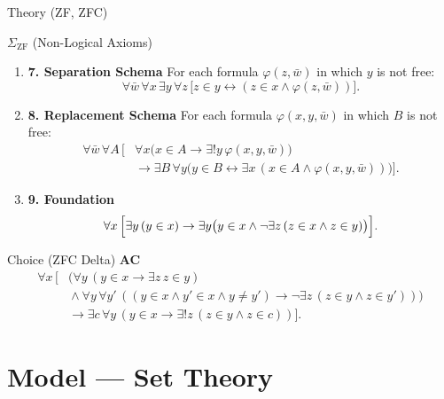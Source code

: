 \documentclass[12pt, a4paper]{report}
\begin{document}
\begin{modelbox}{Theory (ZF, ZFC)}
\begin{modelcomponent}{\(\Sigma_{\mathrm{ZF}}\) (Non-Logical Axioms)}
\begin{enumerate}[leftmargin=1.6em,itemsep=2pt]
  \item \textbf{7. Separation Schema}
  For each formula \(\varphi(z,\bar w)\) in which \(y\) is not free:
  \[
  \forall \bar w\,\forall x\,\exists y\,\forall z\,
  \bigl[z\in y\leftrightarrow (z\in x\wedge \varphi(z,\bar w))\bigr].
  \]

  \item \textbf{8. Replacement Schema}
  For each formula \(\varphi(x,y,\bar w)\) in which \(B\) is not free:
  \[
  \begin{aligned}
  \forall \bar w\,\forall A\,\Big[&
    \forall x\bigl(x\in A\to \exists!y\,\varphi(x,y,\bar w)\bigr)\\
    &{}\to
    \exists B\,\forall y\bigl(y\in B\leftrightarrow
      \exists x\,(x\in A\wedge \varphi(x,y,\bar w))\bigr)
  \Big].
  \end{aligned}
  \]

  \item \textbf{9. Foundation}
  \[
  \forall x\,\Bigl[
    \exists y\,(y\in x)\to
    \exists y\bigl(y\in x\wedge
      \neg\exists z\,(z\in x\wedge z\in y)\bigr)
  \Bigr].
  \]
\end{enumerate}
\end{modelcomponent}

\begin{modelcomponent}{Choice (ZFC Delta)}
\textbf{AC}
  \[
  \begin{aligned}
  \forall x\,\Big[&
    \bigl(\forall y\,(y\in x\to \exists z\,z\in y)\\
    &{}\wedge
    \forall y\,\forall y'\,
      ((y\in x\wedge y'\in x\wedge y\neq y')\to
        \neg\exists z\,(z\in y\wedge z\in y'))\bigr)\\
    &{}\to
    \exists c\,\forall y\,(y\in x\to
      \exists!z\,(z\in y\wedge z\in c))
  \Big].
  \end{aligned}
  \]
\end{modelcomponent}
\end{modelbox}

\clearpage
\section*{Model --- Set Theory}
\end{document}
